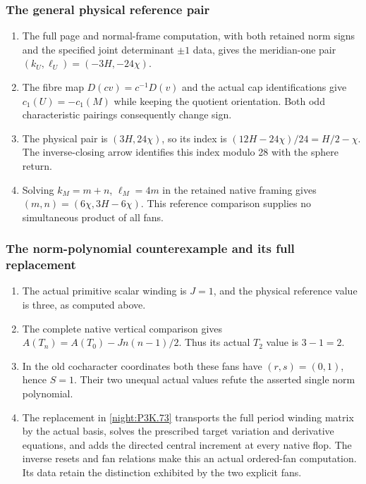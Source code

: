 \subsubsection{The general physical reference pair}
\RungOne
\begin{enumerate}[label=\arabic*.]
\item The full page and normal-frame computation, with both
  retained norm signs and the specified joint determinant
  $\pm1$ data, gives the meridian-one pair
  $(k_U,\ell_U)=(-3H,-24\chi)$.
\item The fibre map $D(cv)=c^{-1}D(v)$ and the actual cap
  identifications give $c_1(U)=-c_1(M)$ while keeping the
  quotient orientation. Both odd characteristic pairings
  consequently change sign.
\item The physical pair is $(3H,24\chi)$, so its index is
  $(12H-24\chi)/24=H/2-\chi$. The inverse-closing arrow
  identifies this index modulo 28 with the sphere return.
\item Solving $k_M=m+n$, $\ell_M=4m$ in the retained native
  framing gives $(m,n)=(6\chi,3H-6\chi)$. This reference
  comparison supplies no simultaneous product of all fans.
\end{enumerate}

\subsubsection{The norm-polynomial counterexample and its full replacement}
\RungOne
\begin{enumerate}[label=\arabic*.]
\item The actual primitive scalar winding is $J=1$, and the
  physical reference value is three, as computed above.
\item The complete native vertical comparison gives
  $A(T_n)=A(T_0)-J n(n-1)/2$. Thus its actual $T_2$ value
  is $3-1=2$.
\item In the old cocharacter coordinates both these fans
  have $(r,s)=(0,1)$, hence $S=1$. Their two unequal
  actual values refute the asserted single norm polynomial.
\item The replacement in \cref{night:P3K.73} transports the
  full period winding matrix by the actual basis, solves
  the prescribed target variation and derivative equations,
  and adds the directed central increment at every native
  flop. The inverse resets and fan relations make this
  an actual ordered-fan computation. Its data retain the
  distinction exhibited by the two explicit fans.
\end{enumerate}


